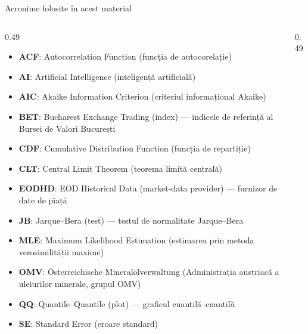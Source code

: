 {
\begin{frame}[noframenumbering]
    \titlepage
\end{frame}
}
\begin{frame}{Acronime folosite în acest material}
\begin{columns}[T]
\begin{column}{0.49\textwidth}
\begin{itemize}\setlength{\itemsep}{0pt}
    \item \textbf{ACF}: Autocorrelation Function (funcția de autocorelație)
    \item \textbf{AI}: Artificial Intelligence (inteligență artificială)
    \item \textbf{AIC}: Akaike Information Criterion (criteriul informațional Akaike)
    \item \textbf{BET}: Bucharest Exchange Trading (index) — indicele de referință al Bursei de Valori București
    \item \textbf{CDF}: Cumulative Distribution Function (funcția de repartiție)
    \item \textbf{CLT}: Central Limit Theorem (teorema limită centrală)
    \item \textbf{EODHD}: EOD Historical Data (market-data provider) — furnizor de date de piață
    \item \textbf{JB}: Jarque–Bera (test) — testul de normalitate Jarque–Bera
    \item \textbf{MLE}: Maximum Likelihood Estimation (estimarea prin metoda verosimilității maxime)
    \item \textbf{OMV}: Österreichische Mineralölverwaltung (Administrația austriacă a uleiurilor minerale, grupul OMV)
    \item \textbf{QQ}: Quantile–Quantile (plot) — graficul cuantilă–cuantilă
    \item \textbf{SE}: Standard Error (eroare standard)
\end{itemize}
\end{column}
\begin{column}{0.49\textwidth}
\end{column}
\end{columns}
\end{frame}

